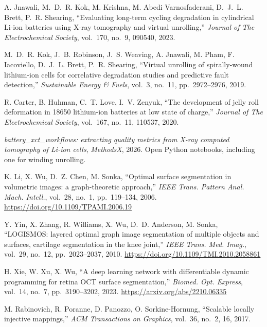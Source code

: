  A. Jnawali, M.~D.~R. Kok, M. Krishna, M. Abedi Varnosfaderani,
  D.~J.~L. Brett, P.~R. Shearing, ``Evaluating long-term cycling degradation in cylindrical
  Li-ion batteries using X-ray tomography and virtual unrolling,'' \emph{Journal of The
  Electrochemical Society}, vol.~170, no.~9, 090540, 2023.

 M.~D.~R. Kok, J.~B. Robinson, J.~S. Weaving, A. Jnawali, M. Pham,
  F. Iacoviello, D.~J.~L. Brett, P.~R. Shearing, ``Virtual unrolling of spirally-wound
  lithium-ion cells for correlative degradation studies and predictive fault detection,''
  \emph{Sustainable Energy \& Fuels}, vol.~3, no.~11, pp.~2972--2976, 2019.

 R. Carter, B. Huhman, C.~T. Love, I.~V. Zenyuk, ``The
  development of jelly roll deformation in 18650 lithium-ion batteries at low state of
  charge,'' \emph{Journal of The Electrochemical Society}, vol.~167, no.~11, 110537, 2020.

 \emph{battery\_xct\_workflows: extracting quality metrics from X-ray
  computed tomography of Li-ion cells}, \emph{MethodsX}, 2026. Open Python notebooks,
  including one for winding unrolling.



 K. Li, X. Wu, D.~Z. Chen, M. Sonka, ``Optimal surface segmentation in
  volumetric images: a graph-theoretic approach,'' \emph{IEEE Trans. Pattern Anal. Mach.
  Intell.}, vol.~28, no.~1, pp.~119--134, 2006. \url{https://doi.org/10.1109/TPAMI.2006.19}

 Y. Yin, X. Zhang, R. Williams, X. Wu, D.~D. Anderson, M. Sonka,
  ``LOGISMOS: layered optimal graph image segmentation of multiple objects and surfaces,
  cartilage segmentation in the knee joint,'' \emph{IEEE Trans. Med. Imag.}, vol.~29, no.~12,
  pp.~2023--2037, 2010. \url{https://doi.org/10.1109/TMI.2010.2058861}

 H. Xie, W. Xu, X. Wu, ``A deep learning network with differentiable dynamic
  programming for retina OCT surface segmentation,'' \emph{Biomed. Opt. Express}, vol.~14,
  no.~7, pp.~3190--3202, 2023. \url{https://arxiv.org/abs/2210.06335}

 M. Rabinovich, R. Poranne, D. Panozzo, O. Sorkine-Hornung, ``Scalable
  locally injective mappings,'' \emph{ACM Transactions on Graphics}, vol.~36, no.~2, 16, 2017.

